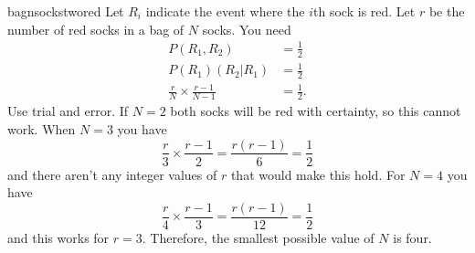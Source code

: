 \begin{answer}{bagnsockstwored}
Let $R_i$ indicate the event where the $i$th sock is red.
Let $r$ be the number of red socks in a bag of $N$ socks.
You need
\begin{align*}
  P(R_1,R_2)     &= \frac{1}{2} \\
  P(R_1)(R_2|R_1) &= \frac{1}{2} \\
  \frac{r}{N} \times
  \frac{r-1}{N-1}
   &=
  \frac{1}{2}
  \text{.}
\end{align*}
Use trial and error.
If $N=2$ both socks will be red with certainty, so this cannot work.
When $N=3$ you have
\[
  \frac{r}{3} \times
  \frac{r-1}{2}
   =
  \frac{r(r-1)}{6}
   =
  \frac{1}{2}
\]
and there aren't any integer values of $r$ that would make this hold.
For $N=4$ you have
\[
  \frac{r}{4} \times
  \frac{r-1}{3}
   =
  \frac{r(r-1)}{12}
   =
  \frac{1}{2}
\]
and this works for $r=3$.
Therefore, the smallest possible value of $N$ is four.
\end{answer}
